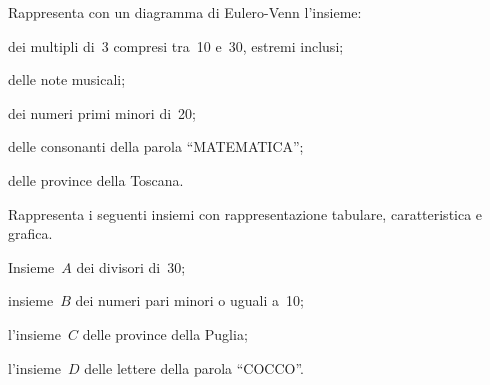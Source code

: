 \begin{esercizio}
\label{ese:6.19}
Rappresenta con un diagramma di Eulero-Venn l'insieme:
\begin{enumeratea}
\item dei multipli di~3 compresi tra~10 e~30, estremi inclusi;
\item delle note musicali;
\item dei numeri primi minori di~20;
\item delle consonanti della parola ``MATEMATICA'';
\item delle province della Toscana.
\end{enumeratea}
\end{esercizio}
%


\begin{esercizio}
\label{ese:6.20}
Rappresenta i seguenti insiemi con rappresentazione tabulare, caratteristica e grafica.
\begin{enumeratea}
\item Insieme~$A$ dei divisori di~30;
\item insieme~$B$ dei numeri pari minori o uguali a~10;
\item l'insieme~$C$ delle province della Puglia;
\item l'insieme~$D$ delle lettere della parola ``COCCO''.
\end{enumeratea}
\end{esercizio}

